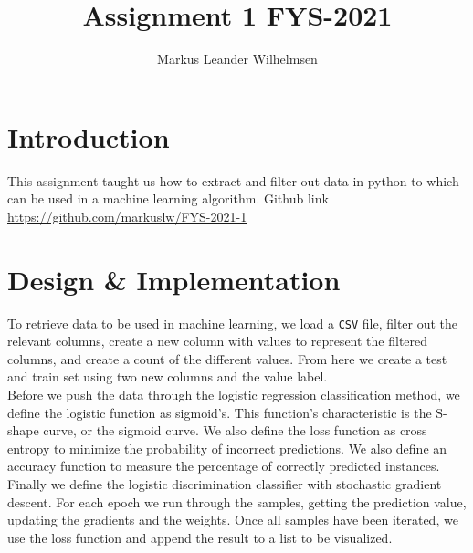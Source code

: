 \documentclass{article}
\title{Assignment 1 FYS-2021}
\author{Markus Leander Wilhelmsen}
\begin{document}
\maketitle

\section{Introduction}
This assignment taught us how to extract and filter out data in python
to which can be used in a machine learning algorithm. Github link
\url{https://github.com/markuslw/FYS-2021-1}

\section{Design \& Implementation}
To retrieve data to be used in machine learning, we load a \verb|CSV| file,
filter out the relevant columns, create a new column with values to
represent the filtered columns, and create a count of the different
values. From here we create a test and train set using two new columns and
the value label.
\\
Before we push the data through the logistic regression classification
method, we define the logistic function as sigmoid's. This function's
characteristic is the S-shape curve, or the sigmoid curve. We also define
the loss function as cross entropy to minimize the probability of incorrect
predictions. We also define an accuracy function to measure the percentage
of correctly predicted instances.
\\
Finally we define the logistic discrimination classifier with
stochastic gradient descent. For each epoch we run through the
samples, getting the prediction value, updating the gradients
and the weights. Once all samples have been iterated, we use the loss
function and append the result to a list to be visualized.
\end{document}
